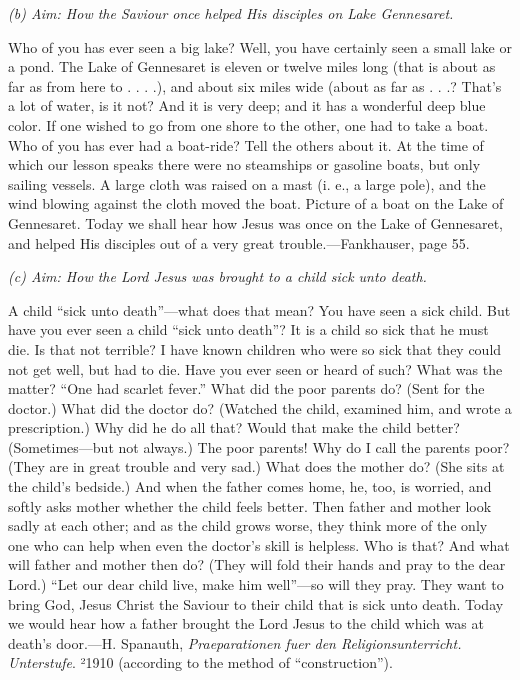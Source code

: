 \emph{(b) Aim: How the Saviour once helped His disciples on Lake Gennesaret.}

Who of you has ever seen a big lake? Well, you have certainly seen a small lake or a pond. The Lake of Gennesaret is eleven or
twelve miles long (that is about as far as from here to . . . .), and about six miles wide (about as far as . . .? That’s a lot of water, is it not? And it is very deep; and it has a wonderful deep blue color. If one wished to go from one shore to the other, one had to take a boat. Who of you has ever had a boat-ride? Tell the others about it. At the time of which our lesson speaks there were no steamships or gasoline boats, but only sailing vessels. A large cloth was raised on a mast (i. e., a large pole), and the wind blowing against the cloth moved the boat. Picture of a boat on the Lake of Gennesaret. Today we shall hear how Jesus was once on the Lake of Gennesaret, and helped His disciples out of a very great trouble.—Fankhauser, page 55.

\emph{(c) Aim: How the Lord Jesus was brought to a child sick unto death.}

A child “sick unto death”—what does that mean? You have seen a sick child. But have you ever seen a child “sick unto death”? It is a child so sick that he must die. Is that not terrible? I have known children who were so sick that they could not get well, but had to die. Have you ever seen or heard of such? What was the matter? “One had scarlet fever.” What did the poor parents do? (Sent for the doctor.) What did the doctor do? (Watched the child, examined him, and wrote a prescription.) Why did he do all that? Would that make the child better? (Sometimes—but not always.) The poor parents! Why do I call the parents poor? (They are in great trouble and very sad.) What does the mother do? (She sits at the child’s bedside.) And when the father comes home, he, too, is worried, and softly asks mother whether the child feels better. Then father and mother look sadly at each other; and as the child grows worse, they think more of the only one who can help when even the doctor’s skill is helpless. Who is that? And what will father and mother then do? (They will fold their hands and pray to the dear Lord.) “Let our dear child live, make him well”—so will they pray. They want to bring God, Jesus Christ the Saviour to their child that is sick unto death. Today we would hear how a father brought the Lord Jesus to the child which was at death’s door.—H. Spanauth, \emph{Praeparationen fuer den Religionsunterricht. Unterstufe}. ²1910 (according to the method of “construction”).

